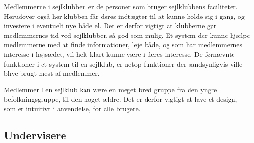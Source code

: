 Medlemmerne i sejlklubben er de personer som bruger sejlklubbens faciliteter. Herudover også her klubben får deres
indtægter til at kunne holde sig i gang, og investere i eventuelt nye både el.  Det er derfor vigtigt at klubberne gør medlemmernes tid ved sejlklubben
så god som mulig. Et system der kunne hjælpe medlemmerne med at finde informationer, leje både, og som har
medlemmernes interesse i højsædet, vil helt klart kunne være i deres interesse. De førnævnte funktioner i et system til
en sejlklub, er netop funktioner der sandsynligvis ville blive brugt mest af medlemmer.

Medlemmer i en sejlklub kan være en meget bred gruppe fra den yngre befolkningsgruppe, til den noget ældre. Det er
derfor vigtigt at lave et design, som er intuitivt i anvendelse, for alle brugere. 





\subsection{Undervisere}

